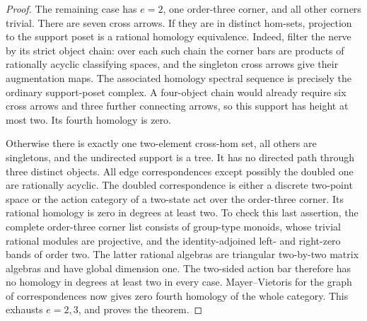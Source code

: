 \begin{proof}
The remaining case has $e=2$, one order-three corner, and
all other corners trivial.  There are seven cross arrows.
If they are in distinct hom-sets, projection to the support
poset is a rational homology equivalence.  Indeed, filter the
nerve by its strict object chain: over each such chain the
corner bars are products of rationally acyclic classifying
spaces, and the singleton cross arrows give their augmentation
maps.  The associated homology spectral sequence is precisely
the ordinary support-poset complex.  A four-object chain would
already require six cross arrows and three further connecting
arrows, so this support has height at most two.  Its fourth
homology is zero.

Otherwise there is exactly one two-element cross-hom set,
all others are singletons, and the undirected support is a
tree.  It has no directed path through three distinct objects.
All edge correspondences except possibly the doubled one are
rationally acyclic.  The doubled correspondence is either a
discrete two-point space or the action category of a two-state
act over the order-three corner.  Its rational homology is
zero in degrees at least two.  To check this last assertion,
the complete order-three corner list consists of group-type
monoids, whose trivial rational modules are projective, and
the identity-adjoined left- and right-zero bands of order two.
The latter rational algebras are triangular two-by-two matrix
algebras and have global dimension one.  The two-sided action
bar therefore has no homology in degrees at least two in
every case.  Mayer--Vietoris for the graph of correspondences
now gives zero fourth homology of the whole category.  This
exhausts $e=2,3$, and proves the theorem.
\end{proof}
